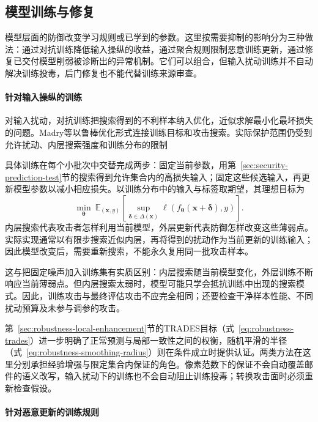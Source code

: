 \subsection{模型训练与修复}
\label{sec:security-prediction-defense}
\label{sec:security-model-defense}

模型层面的防御改变学习规则或已学到的参数。这里按需要抑制的影响分为三种做法：通过对抗训练降低输入操纵的收益，通过聚合规则限制恶意训练更新，通过修复已交付模型削弱被诊断出的异常机制。它们可以组合，但输入扰动训练并不自动解决训练投毒，后门修复也不能代替训练来源审查。

\paragraph{针对输入操纵的训练}

对输入扰动，对抗训练把搜索得到的不利样本纳入优化，近似求解最小化最坏损失的问题。Madry等以鲁棒优化形式连接训练目标和攻击搜索。实际保护范围仍受到允许扰动、内层搜索强度和训练分布的限制

具体训练在每个小批次中交替完成两步：固定当前参数，用第~\ref{sec:security-prediction-test}节的搜索得到允许集合内的高损失输入；固定这些候选输入，再更新模型参数以减小相应损失。以训练分布中的输入与标签取期望，其理想目标为
\begin{equation}
 \min_{\bm\theta}\ \mathbb E_{(\bm x,y)}
 \left[\sup_{\bm\delta\in\Delta(\bm x)}
  \ell(f_{\bm\theta}(\bm x+\bm\delta),y)\right].
 \label{eq:security-adversarial-training}
\end{equation}
内层搜索代表攻击者怎样利用当前模型，外层更新代表防御怎样改变这些薄弱点。实际实现通常以有限步搜索近似内层，再将得到的扰动作为当前更新的训练输入；因此模型改变后，需要重新搜索，不能永久复用同一批攻击样本。

这与把固定噪声加入训练集有实质区别：内层搜索随当前模型变化，外层训练不断响应当前薄弱点。但内层搜索太弱时，模型可能只学会抵抗训练中出现的搜索模式。因此，训练攻击与最终评估攻击不应完全相同；还要检查干净样本性能、不同扰动预算及未参与调参的攻击。

第~\ref{sec:robustness-local-enhancement}节的TRADES目标（式~\eqref{eq:robustness-trades}）进一步明确了正常预测与局部一致性之间的权衡，随机平滑的半径（式~\eqref{eq:robustness-smoothing-radius}）则在条件成立时提供认证。两类方法在这里分别承担经验增强与限定集合内保证的角色。像素范数下的保证不会自动覆盖邮件的语义改写，输入扰动下的训练也不会自动阻止训练投毒；转换攻击面时必须重新检查假设。

\paragraph{针对恶意更新的训练规则}

